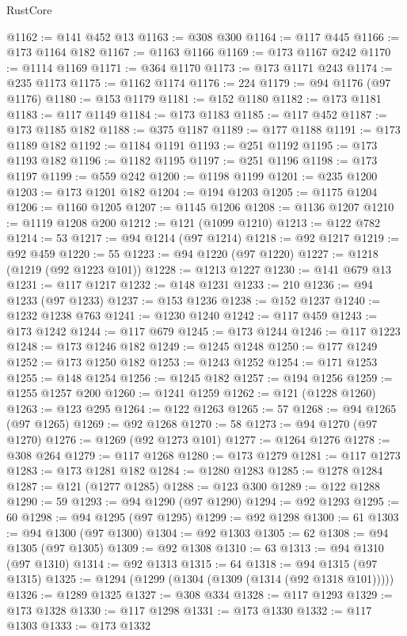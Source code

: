 \begin{lexlean}{RustCore}
\begin{coremodule}
@1162 := @141 @452 @13
@1163 := @308 @300
@1164 := @117 @445
@1166 := @173 @1164 @182
@1167 := @1163 @1166
@1169 := @173 @1167 @242
@1170 := @1114 @1169
@1171 := @364 @1170
@1173 := @173 @1171 @243
@1174 := @235 @1173
@1175 := @1162 @1174
@1176 := 224
@1179 := @94 @1176 (@97 @1176)
@1180 := @153 @1179
@1181 := @152 @1180
@1182 := @173 @1181
@1183 := @117 @1149
@1184 := @173 @1183
@1185 := @117 @452
@1187 := @173 @1185 @182
@1188 := @375 @1187
@1189 := @177 @1188
@1191 := @173 @1189 @182
@1192 := @1184 @1191
@1193 := @251 @1192
@1195 := @173 @1193 @182
@1196 := @1182 @1195
@1197 := @251 @1196
@1198 := @173 @1197
@1199 := @559 @242
@1200 := @1198 @1199
@1201 := @235 @1200
@1203 := @173 @1201 @182
@1204 := @194 @1203
@1205 := @1175 @1204
@1206 := @1160 @1205
@1207 := @1145 @1206
@1208 := @1136 @1207
@1210 := @1119 @1208 @200
@1212 := @121 (@1099 @1210)
@1213 := @122 @782
@1214 := 53
@1217 := @94 @1214 (@97 @1214)
@1218 := @92 @1217
@1219 := @92 @459
@1220 := 55
@1223 := @94 @1220 (@97 @1220)
@1227 := @1218 (@1219 (@92 @1223 @101))
@1228 := @1213 @1227
@1230 := @141 @679 @13
@1231 := @117 @1217
@1232 := @148 @1231
@1233 := 210
@1236 := @94 @1233 (@97 @1233)
@1237 := @153 @1236
@1238 := @152 @1237
@1240 := @1232 @1238 @763
@1241 := @1230 @1240
@1242 := @117 @459
@1243 := @173 @1242
@1244 := @117 @679
@1245 := @173 @1244
@1246 := @117 @1223
@1248 := @173 @1246 @182
@1249 := @1245 @1248
@1250 := @177 @1249
@1252 := @173 @1250 @182
@1253 := @1243 @1252
@1254 := @171 @1253
@1255 := @148 @1254
@1256 := @1245 @182
@1257 := @194 @1256
@1259 := @1255 @1257 @200
@1260 := @1241 @1259
@1262 := @121 (@1228 @1260)
@1263 := @123 @295
@1264 := @122 @1263
@1265 := 57
@1268 := @94 @1265 (@97 @1265)
@1269 := @92 @1268
@1270 := 58
@1273 := @94 @1270 (@97 @1270)
@1276 := @1269 (@92 @1273 @101)
@1277 := @1264 @1276
@1278 := @308 @264
@1279 := @117 @1268
@1280 := @173 @1279
@1281 := @117 @1273
@1283 := @173 @1281 @182
@1284 := @1280 @1283
@1285 := @1278 @1284
@1287 := @121 (@1277 @1285)
@1288 := @123 @300
@1289 := @122 @1288
@1290 := 59
@1293 := @94 @1290 (@97 @1290)
@1294 := @92 @1293
@1295 := 60
@1298 := @94 @1295 (@97 @1295)
@1299 := @92 @1298
@1300 := 61
@1303 := @94 @1300 (@97 @1300)
@1304 := @92 @1303
@1305 := 62
@1308 := @94 @1305 (@97 @1305)
@1309 := @92 @1308
@1310 := 63
@1313 := @94 @1310 (@97 @1310)
@1314 := @92 @1313
@1315 := 64
@1318 := @94 @1315 (@97 @1315)
@1325 := @1294 (@1299 (@1304 (@1309 (@1314 (@92 @1318 @101)))))
@1326 := @1289 @1325
@1327 := @308 @334
@1328 := @117 @1293
@1329 := @173 @1328
@1330 := @117 @1298
@1331 := @173 @1330
@1332 := @117 @1303
@1333 := @173 @1332

\end{coremodule}
\end{lexlean}
